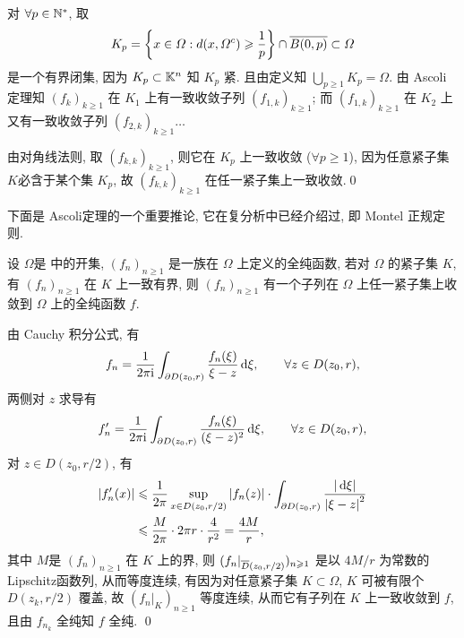 	\begin{Proof}
		对 $ \forall p\in\N^{*} $, 取
		\[
			K_{p}=\left\{ x\in\varOmega: d(x, \varOmega^{c})\geqslant\frac{1}{p} \right\}\cap \baro{B(0, p)}\subset\varOmega
		\]
		是一个有界闭集, 因为 $ K_{p}\subset\K^{n} $ 知 $ K_{p} $ 紧. 且由定义知 $ \bigcup_{p\geqslant1}K_{p}=\varOmega $. 由 Ascoli定理知 $ (f_{k})_{k\geqslant1} $ 在 $ K_{1} $ 上有一致收敛子列 $ (f_{1, k})_{k\geqslant1} $; 而 $ (f_{1, k})_{k\geqslant1} $ 在 $ K_{2} $ 上又有一致收敛子列 $ (f_{2, k})_{k\geqslant1}\dots $

		由对角线法则, 取 $ (f_{k, k})_{k\geqslant1} $, 则它在 $ K_{p} $ 上一致收敛 ($ \forall p\geqslant1 $), 因为任意紧子集$ K $必含于某个集 $ K_{p} $, 故 $ (f_{k, k})_{k\geqslant1} $ 在任一紧子集上一致收敛.\qed
	\end{Proof}

	下面是 Ascoli定理的一个重要推论, 它在复分析中已经介绍过, 即 Montel 正规定则.

	\begin{Theorem}[Montel]
		设 $ \varOmega $是 \C 中的开集, $ (f_{n})_{n\geqslant1} $ 是一族在 $ \varOmega $ 上定义的全纯函数, 若对 $ \varOmega $ 的紧子集 $ K $, 有 $ (f_{n})_{n\geqslant1} $ 在 $ K $ 上一致有界, 则 $ (f_{n})_{n\geqslant1} $ 有一个子列在 $ \varOmega $ 上任一紧子集上收敛到 $ \varOmega $ 上的全纯函数 $ f $.
	\end{Theorem}

	\begin{Proof}
		由 Cauchy 积分公式, 有
		\[
			f_{n}=\frac{1}{2\pi \imag}\int_{\partial D(z_{0}, r)} \frac{f_{n}(\xi)}{\xi-z}\diff \xi,\qquad \forall z\in D(z_{0}, r),
		\]
		两侧对 $ z $ 求导有
		\[
			f'_{n}=\frac{1}{2\pi \imag}\int_{\partial D(z_{0}, r)} \frac{f_{n}(\xi)}{(\xi-z)^{2}}\diff \xi,\qquad \forall z\in D(z_{0}, r),
		\]
		对 $ z\in D(z_{0}, r/2) $, 有
		\[
			\begin{aligned}
				\abs{f'_{n}(x)} & \leqslant \frac{1}{2\pi}\sup_{x\in D(z_{0}, r/2)}\abs{f_{n}(z)}\cdot\int_{\partial D(z_{0}, r)}\frac{\abs{\diff \xi}}{\abs{\xi-z}^{2}}\\
				& \leqslant \frac{M}{2\pi}\cdot 2\pi r\cdot \frac{4}{r^{2}}=\frac{4M}{r},
			\end{aligned}
		\]
		其中 $ M $是 $ (f_{n})_{n\geqslant1} $ 在 $ K $ 上的界, 则 $ (f_{n}|_{\baro{D}(z_{0}, r/2)})_{n\geqslant1} $ 是以 $ 4M/r $ 为常数的  Lipschitz函数列, 从而等度连续, 有因为对任意紧子集 $ K\subset\varOmega $,
		$ K $ 可被有限个 $ D(z_{k}, r/2) $ 覆盖, 故 $ (f_{n}|_{K})_{n\geqslant1} $ 等度连续, 从而它有子列在 $ K $ 上一致收敛到 $ f $, 且由 $ f_{n_{k}} $ 全纯知 $ f $ 全纯. \qed
	\end{Proof}

